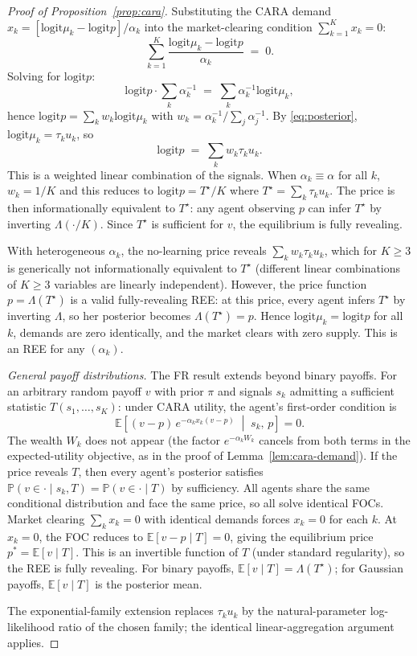 \documentclass[12pt,letterpaper]{article}
\theoremstyle{definition}
\theoremstyle{remark}
\newcommand{\E}{\mathbb{E}}
\newcommand{\PP}{\mathbb{P}}
\newcommand{\Lam}{\Lambda}            %
\newcommand{\logit}{\mathrm{logit}}
\newcommand{\Tstar}{T^{\!\star}}
\newcommand{\1}{\mathbf{1}}
\begin{document}
\begin{proof}[Proof of Proposition~\ref{prop:cara}]
Substituting the CARA demand $x_{k}=[\logit\mu_{k}-\logit p]/\alpha_{k}$
into the market-clearing condition $\sum_{k=1}^{K}x_{k}=0$:
\[
   \sum_{k=1}^{K} \frac{\logit\mu_{k}-\logit p}{\alpha_{k}} \;=\; 0.
\]
Solving for $\logit p$:
\[
   \logit p \cdot \sum_{k}\alpha_{k}^{-1}
   \;=\; \sum_{k}\alpha_{k}^{-1}\logit\mu_{k},
\]
hence $\logit p=\sum_{k}w_{k}\logit\mu_{k}$ with
$w_{k}=\alpha_{k}^{-1}/\sum_{j}\alpha_{j}^{-1}$.
By \eqref{eq:posterior}, $\logit\mu_{k}=\tau_{k}u_{k}$, so
\[
   \logit p \;=\; \sum_{k}w_{k}\tau_{k}u_{k}.
\]
This is a weighted linear combination of the signals. When
$\alpha_{k}\equiv\alpha$ for all $k$, $w_{k}=1/K$ and this reduces to
$\logit p = \Tstar/K$ where $\Tstar=\sum_{k}\tau_{k}u_{k}$. The price is
then informationally equivalent to $\Tstar$: any agent observing $p$
can infer $\Tstar$ by inverting $\Lam(\cdot/K)$. Since $\Tstar$ is
sufficient for $v$, the equilibrium is fully revealing.

With heterogeneous $\alpha_{k}$, the no-learning price reveals
$\sum_{k}w_{k}\tau_{k}u_{k}$, which for $K\geq 3$ is generically not
informationally equivalent to $\Tstar$ (different linear combinations
of $K\geq 3$ variables are linearly independent). However, the price
function $p=\Lam(\Tstar)$ is a valid fully-revealing REE: at this
price, every agent infers $\Tstar$ by inverting $\Lam$, so her posterior
becomes $\Lam(\Tstar)=p$. Hence $\logit\mu_{k}=\logit p$ for all $k$,
demands are zero identically, and the market clears with zero supply.
This is an REE for any $(\alpha_{k})$.

\emph{General payoff distributions.} The FR result extends beyond
binary payoffs. For an arbitrary random payoff $v$ with prior $\pi$ and
signals $s_{k}$ admitting a sufficient statistic $T(s_{1},\ldots,s_{K})$:
under CARA utility, the agent's first-order condition is
\[
   \E\!\left[(v-p)\,e^{-\alpha_{k} x_{k}(v-p)} \;\middle|\; s_{k},\, p\right] = 0.
\]
The wealth $W_{k}$ does not appear (the factor $e^{-\alpha_{k}W_{k}}$
cancels from both terms in the expected-utility objective, as in the
proof of Lemma~\ref{lem:cara-demand}). If the price reveals $T$, then
every agent's posterior satisfies
$\PP(v\in\cdot \mid s_{k}, T) = \PP(v\in\cdot\mid T)$
by sufficiency. All agents share the same conditional distribution and
face the same price, so all solve identical FOCs. Market clearing
$\sum_{k}x_{k}=0$ with identical demands forces $x_{k}=0$ for each $k$.
At $x_{k}=0$, the FOC reduces to $\E[v-p\mid T]=0$, giving the
equilibrium price $p^{*}=\E[v\mid T]$. This is an invertible function
of $T$ (under standard regularity), so the REE is fully revealing.
For binary payoffs, $\E[v\mid T]=\Lam(\Tstar)$; for Gaussian payoffs,
$\E[v\mid T]$ is the posterior mean.

The exponential-family extension replaces $\tau_{k}u_{k}$ by the
natural-parameter log-likelihood ratio of the chosen family; the
identical linear-aggregation argument applies.
\end{proof}
\end{document}
